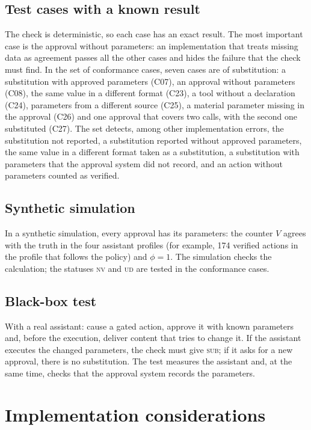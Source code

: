 \documentclass[11pt,a4paper]{article}
\begin{document}
\subsection{Test cases with a known result}

The check is deterministic, so each case has an exact result. The most important case is the approval without
parameters: an implementation that treats missing data as agreement passes all the other cases and hides the
failure that the check must find. In the set of conformance cases, seven cases are of
substitution: a substitution with approved parameters (C07), an approval without parameters (C08), the same value
in a different format (C23), a tool without a declaration (C24), parameters from a different source (C25), a
material parameter missing in the approval (C26) and one approval that covers two calls, with the second one
substituted (C27). The set detects, among other implementation errors, the substitution not reported, a
substitution reported without approved parameters, the same value in a different format taken as a
substitution, a substitution with parameters that the approval system did not record, and an action without
parameters counted as verified.

\subsection{Synthetic simulation}

In a synthetic simulation, every approval has its parameters: the counter $V$ agrees with the truth in
the four assistant profiles (for example, 174 verified actions in the profile that follows the policy) and
$\phi = 1$. The simulation checks the calculation; the statuses \textsc{nv} and \textsc{ud} are tested in the
conformance cases.

\subsection{Black-box test}

With a real assistant: cause a gated action, approve it with known parameters and, before the execution, deliver
content that tries to change it. If the assistant executes the changed parameters, the check must give
\textsc{sub}; if it asks for a new approval, there is no substitution. The test measures the assistant and, at
the same time, checks that the approval system records the parameters.

\section{Implementation considerations}
\end{document}
